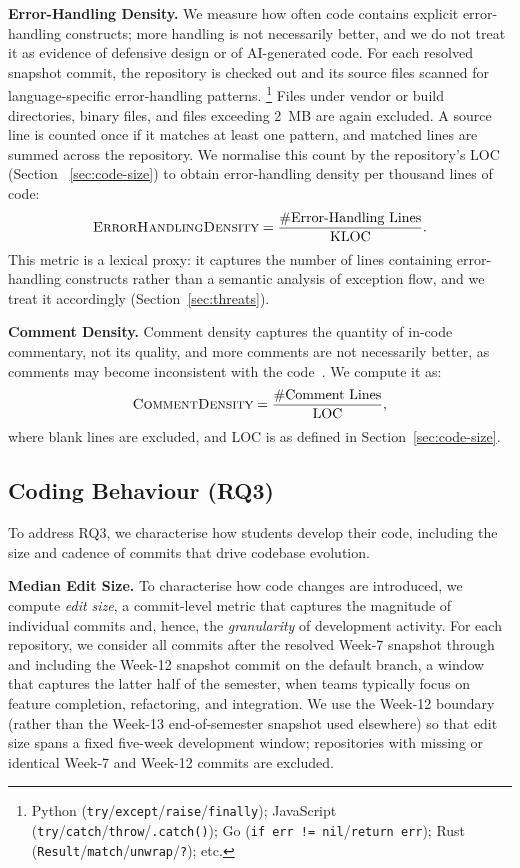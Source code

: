 \documentclass[sigconf,authorversion]{acmart}
\newcommand{\todo}[1]{#1}
\begin{document}
\textbf{Error-Handling Density.}
\label{sec:error-handling}
\todo{We measure how often code contains explicit error-handling constructs; more handling is not necessarily better, and we do not treat it as evidence of defensive design or of AI-generated code.}
For each resolved snapshot commit, the repository is checked out and its source files scanned for language-specific error-handling patterns.%
\footnote{Python \big(\texttt{try}/\texttt{except}/\texttt{raise}/\texttt{finally}\big); 
JavaScript \big(\texttt{try}/\texttt{catch}/\texttt{throw}/\texttt{.catch()}\big); 
Go \big(\texttt{if err != nil}/\texttt{return err}\big); 
Rust \big(\texttt{Result}/\texttt{match}/\texttt{unwrap}/\texttt{?}\big); etc.} Files under vendor or build directories, binary files, and files exceeding 2~MB are again excluded. A source line is counted once if it matches at least one pattern, and matched lines are summed across the repository. We normalise this count by the repository's LOC (Section ~\ref{sec:code-size}) to obtain error-handling density per thousand lines of code:
\[
\textsc{ErrorHandlingDensity} =
\frac{\text{\#Error-Handling Lines}}{\text{KLOC}}. 
\]
This metric is a lexical proxy: it captures the number of lines containing error-handling constructs rather than a semantic analysis of exception flow, and we treat it accordingly (Section~\ref{sec:threats}).

\textbf{Comment Density.}
\label{sec:comment-density}
\todo{Comment density captures the quantity of in-code commentary, not its quality, and more comments are not necessarily better, as comments may become inconsistent with the code~\cite{wen2019comments}.} We compute it as:
\[
\textsc{CommentDensity} =
\frac{\text{\#Comment Lines}}{\text{LOC}},
\]
where blank lines are excluded, \todo{and LOC is as defined in Section~\ref{sec:code-size}.}

\subsection{Coding Behaviour (RQ3)}
\label{sec:coding-behaviour}
To address RQ3, we characterise how students develop their code, including the size and cadence of commits that drive codebase evolution.

\textbf{Median Edit Size.}
\label{sec:edit-size}
To characterise how code changes are introduced, we compute \emph{edit size}, a commit-level metric that captures the magnitude of individual commits and, hence, the \emph{granularity} of development activity. For each repository, we consider all commits after the resolved Week-7 snapshot through and including the Week-12 snapshot commit on the default branch, a window that captures the latter half of the semester, when teams typically focus on feature completion, refactoring, and integration. We use the Week-12 boundary (rather than the Week-13 end-of-semester snapshot used elsewhere) so that edit size spans a fixed five-week development window; repositories with missing or identical Week-7 and Week-12 commits are excluded.
\end{document}
